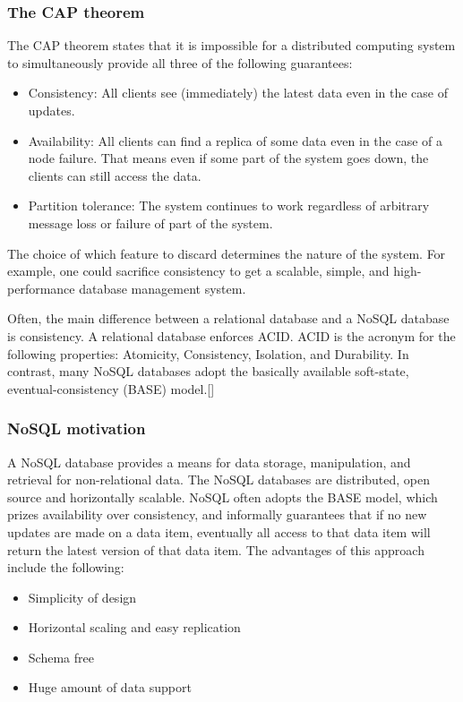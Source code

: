 \subsubsection*{The CAP theorem}
The CAP theorem states that it is impossible for a distributed computing system to simultaneously provide all three of the following guarantees:
\begin{itemize}
	\item Consistency: All clients see (immediately) the latest data even in the case of updates.
	\item Availability: All clients can find a replica of some data even in the case of a node failure. That means even if some part of the system goes down, the clients can still access the data.
	\item Partition tolerance: The system continues to work regardless of arbitrary message loss or failure of part of the system.
\end{itemize}

The choice of which feature to discard determines the nature of the system. For example, one could sacrifice consistency to get a scalable, simple, and high-performance database management system.
\newline

Often, the main difference between a relational database and a NoSQL database is consistency. A relational database enforces ACID. ACID is the acronym for the following properties: Atomicity, Consistency, Isolation, and Durability. In contrast, many NoSQL databases adopt the basically available soft-state, eventual-consistency (BASE) model.[\cite{14}]

\subsubsection*{NoSQL motivation}
A NoSQL database provides a means for data storage, manipulation, and retrieval for non-relational data. The NoSQL databases are distributed, open source and horizontally scalable. NoSQL often adopts the BASE model, which prizes availability over consistency, and informally guarantees that if no new updates are made on a data item, eventually all access to that data item will return the latest version of that data item. The advantages of this approach include the following:
\begin{itemize}
	\item Simplicity of design
	\item Horizontal scaling and easy replication
	\item Schema free
	\item Huge amount of data support
\end{itemize}

